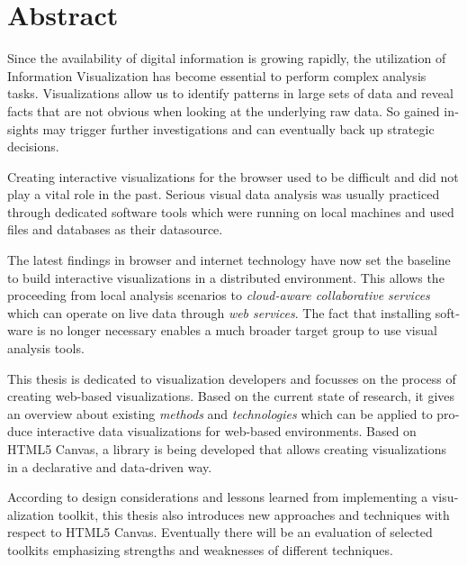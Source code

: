 \chapter{Abstract}

\begin{english} %

Since the availability of digital information is growing rapidly, the utilization of Information Visualization has become essential to perform complex analysis tasks. Visualizations allow us to identify patterns in large sets of data and reveal facts that are not obvious when looking at the underlying raw data. So gained insights may trigger further investigations and can eventually back up strategic decisions.

Creating interactive visualizations for the browser used to be difficult and did not play a vital role in the past. Serious visual data analysis was usually practiced through dedicated software tools which were running on local machines and used files and databases as their datasource.

The latest findings in browser and internet technology have now set the baseline to build interactive visualizations in a distributed environment. This allows the proceeding from local analysis scenarios to \emph{cloud-aware collaborative services} which can operate on live data through \emph{web services}. The fact that installing software is no longer necessary enables a much broader target group to use visual analysis tools.

This thesis is dedicated to visualization developers and focusses on the process of creating web-based visualizations. Based on the current state of research, it gives an overview about existing \emph{methods} and \emph{technologies} which can be applied to produce interactive data visualizations for web-based environments. Based on HTML5 Canvas, a library is being developed that allows creating visualizations in a declarative and data-driven way.

According to design considerations and lessons learned from implementing a visualization toolkit, this thesis also introduces new approaches and techniques with respect to HTML5 Canvas. Eventually there will be an evaluation of selected toolkits emphasizing strengths and weaknesses of different techniques.

\end{english}